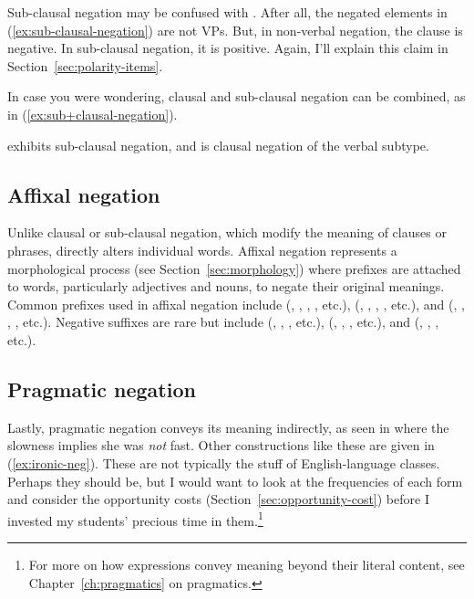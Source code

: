 Sub-clausal negation may be confused with . After all, the negated elements in (\ref{ex:sub-clausal-negation}) are not VPs. But, in non-verbal negation, the clause is negative. In sub-clausal negation, it is positive. Again, I'll explain this claim in Section~\ref{sec:polarity-items}.

In case you were wondering, clausal and sub-clausal negation can be combined, as in (\ref{ex:sub+clausal-negation}).

 \label{ex:sub+clausal-negation}
\z
{} exhibits sub-clausal negation, and  is clausal negation of the verbal subtype.

\subsection{Affixal negation}

Unlike clausal or sub-clausal negation, which modify the meaning of clauses or phrases,  directly alters individual words. Affixal negation represents a morphological process (see Section~\ref{sec:morphology}) where prefixes are attached to words, particularly adjectives and nouns, to negate their original meanings. Common prefixes used in affixal negation include  (, , , , etc.),  (, , , , etc.), and  (, , , , etc.). Negative suffixes are rare but include  (, , , etc.),  (, , , etc.), and  (, , , etc.).

\subsection{Pragmatic negation}\label{sec:pragmatic-neg}

Lastly, pragmatic negation conveys its meaning indirectly, as seen in  where the slowness implies she was \emph{not} fast. Other constructions like these are given in (\ref{ex:ironic-neg}). These are not typically the stuff of English-language classes. Perhaps they should be, but I would want to look at the frequencies of each form and consider the opportunity costs (Section~\ref{sec:opportunity-cost}) before I invested my students' precious time in them.\footnote{For more on how expressions convey meaning beyond their literal content, see Chapter~\ref{ch:pragmatics} on pragmatics.}

